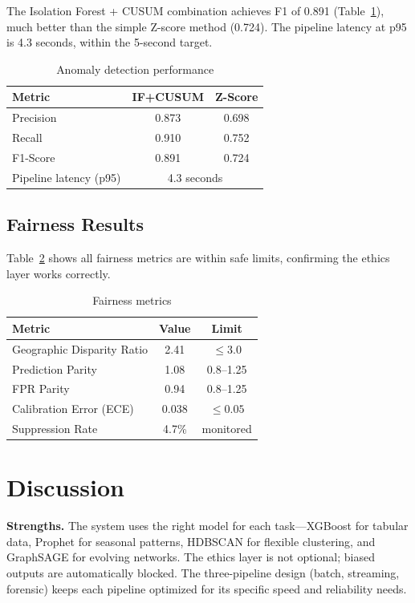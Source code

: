 \documentclass[a4paper,10pt,twocolumn]{article}
\begin{document}
The Isolation Forest + CUSUM combination achieves F1 of 0.891 (Table~\ref{tab:anomaly}), much better than the simple Z-score method (0.724). The pipeline latency at p95 is 4.3 seconds, within the 5-second target.

\begin{table}[H]
\centering
\caption{Anomaly detection performance}
\label{tab:anomaly}
\begin{tabular}{@{}lcc@{}}
\toprule
\textbf{Metric} & \textbf{IF+CUSUM} & \textbf{Z-Score} \\
\midrule
Precision & 0.873 & 0.698 \\
Recall & 0.910 & 0.752 \\
F1-Score & 0.891 & 0.724 \\
Pipeline latency (p95) & \multicolumn{2}{c}{4.3 seconds} \\
\bottomrule
\end{tabular}
\end{table}

\subsection{Fairness Results}

Table~\ref{tab:fair} shows all fairness metrics are within safe limits, confirming the ethics layer works correctly.

\begin{table}[H]
\centering
\caption{Fairness metrics}
\label{tab:fair}
\begin{tabular}{@{}lcc@{}}
\toprule
\textbf{Metric} & \textbf{Value} & \textbf{Limit} \\
\midrule
Geographic Disparity Ratio & 2.41 & $\leq 3.0$ \\
Prediction Parity & 1.08 & 0.8--1.25 \\
FPR Parity & 0.94 & 0.8--1.25 \\
Calibration Error (ECE) & 0.038 & $\leq 0.05$ \\
Suppression Rate & 4.7\% & monitored \\
\bottomrule
\end{tabular}
\end{table}

\section{Discussion}

\textbf{Strengths.} The system uses the right model for each task---XGBoost for tabular data, Prophet for seasonal patterns, HDBSCAN for flexible clustering, and GraphSAGE for evolving networks. The ethics layer is not optional; biased outputs are automatically blocked. The three-pipeline design (batch, streaming, forensic) keeps each pipeline optimized for its specific speed and reliability needs.
\end{document}
